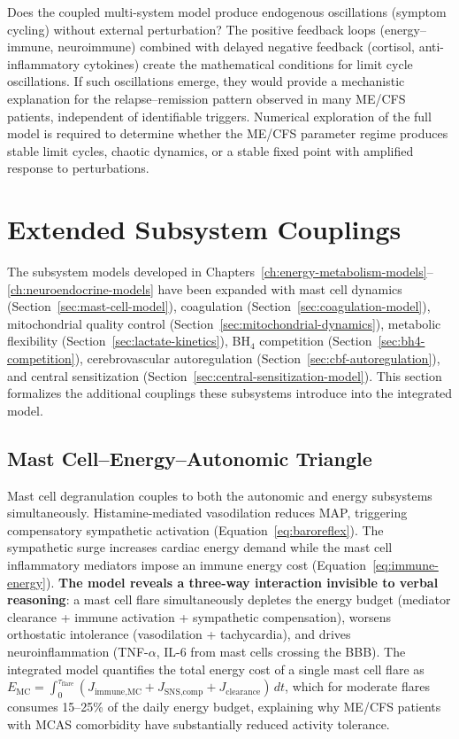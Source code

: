 \begin{open_question}
Does the coupled multi-system model produce endogenous oscillations (symptom cycling) without external perturbation? The positive feedback loops (energy--immune, neuroimmune) combined with delayed negative feedback (cortisol, anti-inflammatory cytokines) create the mathematical conditions for limit cycle oscillations. If such oscillations emerge, they would provide a mechanistic explanation for the relapse--remission pattern observed in many ME/CFS patients, independent of identifiable triggers. Numerical exploration of the full model is required to determine whether the ME/CFS parameter regime produces stable limit cycles, chaotic dynamics, or a stable fixed point with amplified response to perturbations.
\end{open_question}

\section{Extended Subsystem Couplings}
\label{sec:extended-couplings}

The subsystem models developed in Chapters~\ref{ch:energy-metabolism-models}--\ref{ch:neuroendocrine-models} have been expanded with mast cell dynamics (Section~\ref{sec:mast-cell-model}), coagulation (Section~\ref{sec:coagulation-model}), mitochondrial quality control (Section~\ref{sec:mitochondrial-dynamics}), metabolic flexibility (Section~\ref{sec:lactate-kinetics}), BH$_4$ competition (Section~\ref{sec:bh4-competition}), cerebrovascular autoregulation (Section~\ref{sec:cbf-autoregulation}), and central sensitization (Section~\ref{sec:central-sensitization-model}). This section formalizes the additional couplings these subsystems introduce into the integrated model.

\subsection{Mast Cell--Energy--Autonomic Triangle}

Mast cell degranulation couples to both the autonomic and energy subsystems simultaneously. Histamine-mediated vasodilation reduces MAP, triggering compensatory sympathetic activation (Equation~\ref{eq:baroreflex}). The sympathetic surge increases cardiac energy demand while the mast cell inflammatory mediators impose an immune energy cost (Equation~\ref{eq:immune-energy}). \textbf{The model reveals a three-way interaction invisible to verbal reasoning}: a mast cell flare simultaneously depletes the energy budget (mediator clearance + immune activation + sympathetic compensation), worsens orthostatic intolerance (vasodilation + tachycardia), and drives neuroinflammation (TNF-$\alpha$, IL-6 from mast cells crossing the BBB). The integrated model quantifies the total energy cost of a single mast cell flare as $E_{\text{MC}} = \int_0^{\tau_{\text{flare}}} (J_{\text{immune,MC}} + J_{\text{SNS,comp}} + J_{\text{clearance}}) \, dt$, which for moderate flares consumes 15--25\% of the daily energy budget, explaining why ME/CFS patients with MCAS comorbidity have substantially reduced activity tolerance.

